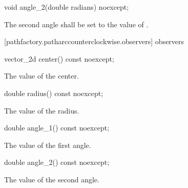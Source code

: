\begin{itemdecl}
    void angle_2(double radians) noexcept;
\end{itemdecl}
\begin{itemdescr}
	\pnum
	\effects
	The second angle shall be set to the value of .
\end{itemdescr}

 [pathfactory.patharccounterclockwise.observers]{ observers}

\begin{itemdecl}
    vector_2d center() const noexcept;
\end{itemdecl}
\begin{itemdescr}
	\pnum
	\returns
	The value of the center.
\end{itemdescr}

\begin{itemdecl}
    double radius() const noexcept;
\end{itemdecl}
\begin{itemdescr}
	\pnum
	\returns
	The value of the radius.
\end{itemdescr}

\begin{itemdecl}
    double angle_1() const noexcept;
\end{itemdecl}
\begin{itemdescr}
	\pnum
	\returns
	The value of the first angle.
\end{itemdescr}

\begin{itemdecl}
    double angle_2() const noexcept;
\end{itemdecl}
\begin{itemdescr}
	\pnum
	\returns
	The value of the second angle.
\end{itemdescr}
